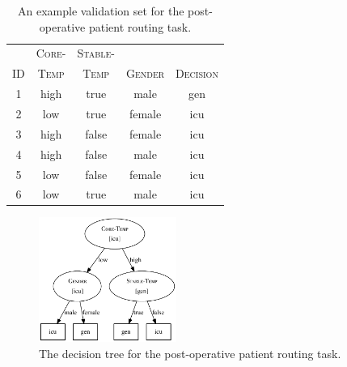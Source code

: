 \documentclass[xcolor={table}]{beamer}
\newcommand{\featN}[1]{\textsc{#1}}
\begin{document}
 \begin{frame} 
\begin{table}
\caption{An example validation set for the post-operative patient routing task.}
\label{tab:pruningset}
\centering
\begin{footnotesize}
\begin{tabular}{ c c c c c}
\hline
	 & \featN{Core-} & \featN{Stable-} &  & \\
\featN{ID}	 & \featN{Temp} & \featN{Temp} & \featN{Gender} & \featN{Decision}\\
\hline
1 & high & true & male & gen\\ 
2 & low & true & female & icu\\ 
3 & high & false & female & icu\\ 
4 & high & false & male & icu\\ 
5 & low & false & female & icu\\ 
6 & low & true & male & icu\\ 
\hline
\end{tabular}
\end{footnotesize}
\end{table}
\end{frame} 

 \begin{frame} 
\begin{figure}
\centerline{
	\includegraphics[width=0.4\textwidth]{./images/dtree-pruning-post-op1_mod.pdf}
}
\caption{The decision tree for the post-operative patient routing task.}
\label{fig:dtree-postop1}
\end{figure}
\end{frame} 
\end{document}
